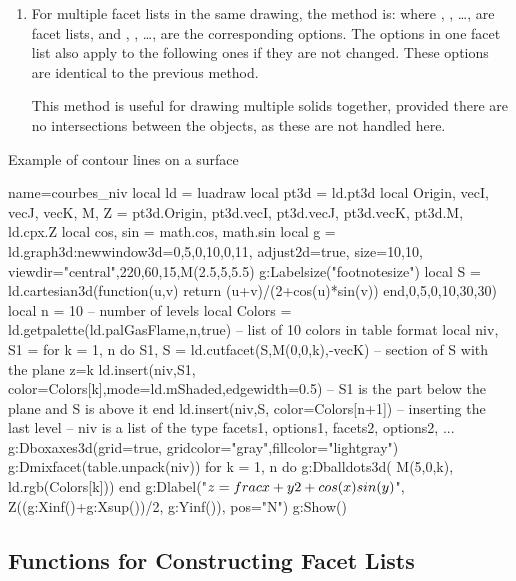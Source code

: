 \begin{enumerate}
    \item For multiple facet lists in the same drawing, the method is:
where , , \ldots, are facet lists, and , , \ldots, are the corresponding options. The options in one facet list also apply to the following ones if they are not changed. These options are identical to the previous method.

This method is useful for drawing multiple solids together, provided there are no intersections between the objects, as these are not handled here.
\end{enumerate}

\begin{demo}[courbeniv]{Example of contour lines on a surface}
\begin{luadraw}{name=courbes_niv}
local ld = luadraw
local pt3d = ld.pt3d
local Origin, vecI, vecJ, vecK, M, Z = pt3d.Origin, pt3d.vecI, pt3d.vecJ, pt3d.vecK, pt3d.M, ld.cpx.Z
local cos, sin = math.cos, math.sin
local g = ld.graph3d:new{window3d={0,5,0,10,0,11}, adjust2d=true, size={10,10},
    viewdir={"central",220,60,15,M(2.5,5,5.5)}}
g:Labelsize("footnotesize")
local S = ld.cartesian3d(function(u,v) return (u+v)/(2+cos(u)*sin(v)) end,0,5,0,10,{30,30})
local n = 10 -- number of levels
local Colors = ld.getpalette(ld.palGasFlame,n,true) -- list of 10 colors in table format
local niv, S1 = {}
for k = 1, n do
    S1, S = ld.cutfacet(S,{M(0,0,k),-vecK}) -- section of S with the plane z=k
    ld.insert(niv,{S1, {color=Colors[k],mode=ld.mShaded,edgewidth=0.5}}) -- S1 is the part below the plane and S is above it
end
ld.insert(niv,{S, {color=Colors[n+1]}}) -- inserting the last level
-- niv is a list of the type {facets1, options1, facets2, options2, ...}
g:Dboxaxes3d({grid=true, gridcolor="gray",fillcolor="lightgray"})
g:Dmixfacet(table.unpack(niv))
for k = 1, n do
    g:Dballdots3d( M(5,0,k), ld.rgb(Colors[k]))
end
g:Dlabel("$z=\\frac{x+y}{2+\\cos(x)\\sin(y)}$", Z((g:Xinf()+g:Xsup())/2, g:Yinf()), {pos="N"})
g:Show()
\end{luadraw}
\end{demo}

\subsection{Functions for Constructing Facet Lists}


